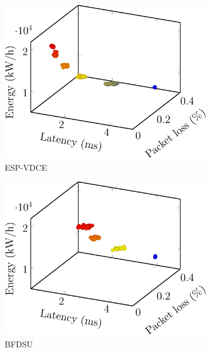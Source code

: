 \begin{figure}[t!]
    \begin{subfigure}[b]{0.32\linewidth}
        \includegraphics[width=\textwidth]{graphs/comparison/esp_vdce-crop}
        \caption{ESP-VDCE \cite{KaurGK020}}
    \end{subfigure}
    \begin{subfigure}[b]{0.32\linewidth}
        \includegraphics[width=\textwidth]{graphs/comparison/bfdsu-crop}
        \caption{BFDSU \cite{ZhangXLLGW17}}
    \end{subfigure}
    \begin{subfigure}[b]{0.32\linewidth}

\end{subfigure}
\end{figure}
